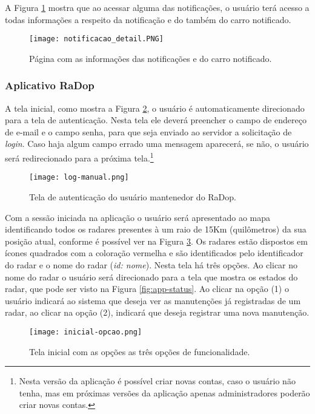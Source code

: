  A Figura \ref{notificacao_detail} mostra que ao acessar alguma das notificações, o usuário terá acesso a todas informações a respeito da notificação e do também do carro notificado. 
 
     \begin{figure}[H]
     \centering
     \texttt{[image: notificacao\_detail.PNG]}
     \caption{Página com as informações das notificações e do carro notificado.}
     \label{notificacao_detail}
 \end{figure}
 
 

\subsubsection{Aplicativo RaDop}

A tela inicial, como mostra a Figura \ref{fig:app-login}, o usuário é automaticamente direcionado para a tela de autenticação. Nesta tela ele deverá preencher o campo de endereço de e-mail e o campo senha, para que seja enviado ao servidor a solicitação de \textit{login}. Caso haja algum campo errado uma mensagem aparecerá, se não, o usuário será redirecionado para a próxima tela.\footnote{Nesta versão da aplicação é possível criar novas contas, caso o usuário não tenha, mas em próximas versões da aplicação apenas administradores poderão criar novas contas.} 

    \begin{figure}[H]
        \centering
        \texttt{[image: log-manual.png]}
        \caption{Tela de autenticação do usuário mantenedor do RaDop.}
        \label{fig:app-login}
    \end{figure}

Com a sessão iniciada na aplicação o usuário será apresentado ao mapa identificando todos os radares presentes à um raio de 15Km (quilômetros) da sua posição atual, conforme é possível ver na Figura \ref{fig:app-inicial}. Os radares estão dispostos em ícones quadrados com a coloração vermelha e são identificados pelo identificador do radar e o nome do radar (\textit{id: nome}). Nesta tela há três opções. Ao clicar no nome do radar o usuário será direcionado para a tela que mostra os estados do radar, que pode ser visto na Figura \ref{fig:app-status}. Ao clicar na opção (1) o usuário indicará ao sistema que deseja ver as manutenções já registradas de um radar, ao clicar na opção (2), indicará que deseja registrar uma nova manutenção.

    \begin{figure}[H]
        \centering
        \texttt{[image: inicial-opcao.png]}
        \caption{Tela inicial com as opções as três opções de funcionalidade.}
        \label{fig:app-inicial}
    \end{figure}
    
